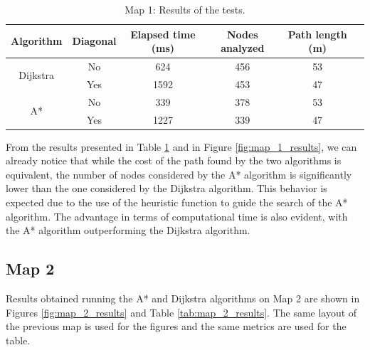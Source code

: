 \begin{table}[H]
    \centering
    \begin{tabular}{|c|c|c|c|c|c|}
        \hline
        \textbf{Algorithm}        & \textbf{Diagonal} & \textbf{Elapsed time (ms)} & \textbf{Nodes analyzed} & \textbf{Path length (m)} \\
        \hline
        \multirow{2}{*}{Dijkstra} & No                & 624                        & 456                     & 53                       \\
                                  & Yes               & 1592                       & 453                     & 47                       \\
        \hline
        \multirow{2}{*}{A*}       & No                & 339                        & 378                     & 53                       \\
                                  & Yes               & 1227                       & 339                     & 47                       \\
        \hline
    \end{tabular}
    \caption{Map 1: Results of the tests.}
    \label{tab:map_1_results}
\end{table}

From the results presented in Table \ref{tab:map_1_results} and in Figure \ref{fig:map_1_results}, we can already notice that while the cost of the path found by the two algorithms is equivalent, the number of nodes considered by the A* algorithm is significantly lower than the one considered by the Dijkstra algorithm.
This behavior is expected due to the use of the heuristic function to guide the search of the A* algorithm.
The advantage in terms of computational time is also evident, with the A* algorithm outperforming the Dijkstra algorithm.



\subsection{Map 2}
\label{subsec:map_2}

Results obtained running the A* and Dijkstra algorithms on Map 2 are shown in Figures \ref{fig:map_2_results} and Table \ref{tab:map_2_results}.
The same layout of the previous map is used for the figures and the same metrics are used for the table.


